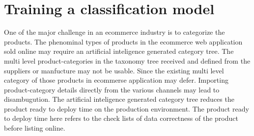 \chapter{Training a classification model}

One of the major challenge in an ecommerce industry is to categorize the products. The phenominal types of products in the ecommerce web application sold online may require an artificial inteligence generated category tree. The multi level product-categories in the taxonomy tree received and defined from the suppliers or manfucture may not be usable. Since the existing multi level category of those products in ecommerse application may defer. Importing product-category details directly from the various channels may lead to disambugution. The artificial inteligence generated category tree reduces the product ready to deploy time on the production environment. The product ready to deploy time here refers to the check lists of data correctness of the product before listing online.